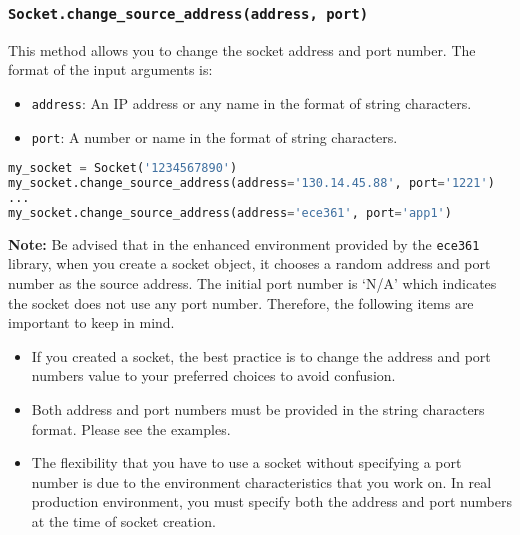 \documentclass[11pt]{article}
\begin{document}
\subsubsection{\texttt{Socket.\textbf{change\_source\_address(address, port)}}}
This method allows you to change the socket address and port number. The format of the input arguments is:
\begin{itemize}
    \item \texttt{address}: An IP address or any name in the format of string characters.
    \item \texttt{port}: A number or name in the format of string characters.
\end{itemize}

\begin{lstlisting}[caption={Example for using \texttt{change\_source\_address()}}, language=Python]
my_socket = Socket('1234567890')
my_socket.change_source_address(address='130.14.45.88', port='1221')
...
my_socket.change_source_address(address='ece361', port='app1')
\end{lstlisting}

\textbf{Note:}
Be advised that in the enhanced environment provided by the \texttt{ece361} library, when you create a socket object, it chooses a random address and port number as the source address. The initial port number is ‘N/A' which indicates the socket does not use any port number. Therefore, the following items are important to keep in mind.
\begin{itemize}
    \item If you created a socket, the best practice is to change the address and port numbers value to your preferred choices to avoid confusion. 
    \item Both address and port numbers must be provided in the string characters format. Please see the examples.
    \item The flexibility that you have to use a socket without specifying a port number is due to the environment characteristics that you work on. In real production environment, you must specify both the address and port numbers at the time of socket creation.
\end{itemize}

\end{document}
